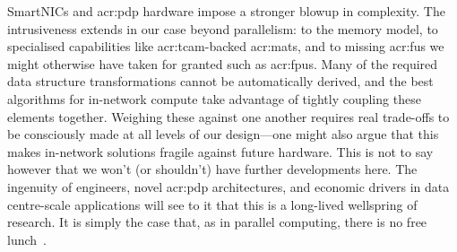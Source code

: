 %	
SmartNICs and \gls{acr:pdp} hardware impose a stronger blowup in complexity.
The intrusiveness extends in our case beyond parallelism: to the memory model, to specialised capabilities like \gls{acr:tcam}-backed \glspl{acr:mat}, and to missing \glspl{acr:fu} we might otherwise have taken for granted such as \glspl{acr:fpu}.
Many of the required data structure transformations cannot be automatically derived, and the best algorithms for in-network compute take advantage of tightly coupling these elements together.
Weighing these against one another requires real trade-offs to be consciously made at all levels of our design---one might also argue that this makes in-network solutions fragile against future hardware.
%
This is not to say however that we won't (or shouldn't) have further developments here.
The ingenuity of engineers, novel \gls{acr:pdp} architectures, and economic drivers in data centre-scale applications will see to it that this is a long-lived wellspring of research.
It is simply the case that, as in parallel computing, there is no free lunch~\parencite{sutter-freelunch}.



